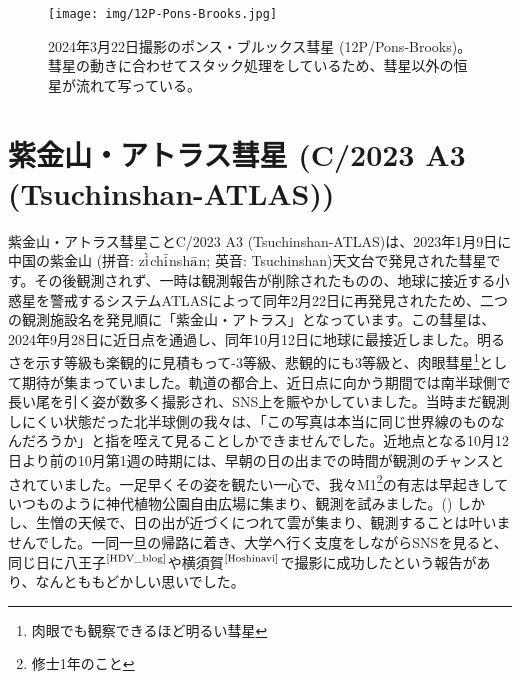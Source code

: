 \documentclass{supernova_pre}
\begin{document}
\begin{figure}[H]
  \centering
  \texttt{[image: img/12P-Pons-Brooks.jpg]}
  \caption{2024年3月22日撮影のポンス・ブルックス彗星 (12P/Pons-Brooks)。彗星の動きに合わせてスタック処理をしているため、彗星以外の恒星が流れて写っている。}
  \label{fig:Pons-Brooks}
\end{figure}

\section{紫金山・アトラス彗星 (C/2023 A3 (Tsuchinshan-ATLAS))}

紫金山・アトラス彗星ことC/2023 A3 (Tsuchinshan-ATLAS)は、2023年1月9日に中国の紫金山 (拼音: z$\Grave{\textrm{{i}}}$ch$\Bar{\textrm{{i}}}$nsh$\Bar{\textrm{{a}}}$n; 英音: Tsuchinshan)天文台で発見された彗星です。その後観測されず、一時は観測報告が削除されたものの、地球に接近する小惑星を警戒するシステムATLASによって同年2月22日に再発見されたため、二つの観測施設名を発見順に「紫金山・アトラス」となっています。この彗星は、2024年9月28日に近日点を通過し、同年10月12日に地球に最接近しました。明るさを示す等級も楽観的に見積もって-3等級、悲観的にも3等級と、肉眼彗星\footnote{肉眼でも観察できるほど明るい彗星}として期待が集まっていました。軌道の都合上、近日点に向かう期間では南半球側で長い尾を引く姿が数多く撮影され、SNS上を賑やかしていました。当時まだ観測しにくい状態だった北半球側の我々は、「この写真は本当に同じ世界線のものなんだろうか」と指を咥えて見ることしかできませんでした。近地点となる10月12日より前の10月第1週の時期には、早朝の日の出までの時間が観測のチャンスとされていました。一足早くその姿を観たい一心で、我々M1\footnote{修士1年のこと}の有志は早起きしていつものように神代植物公園自由広場に集まり、観測を試みました。() しかし、生憎の天候で、日の出が近づくにつれて雲が集まり、観測することは叶いませんでした。一同一旦の帰路に着き、大学へ行く支度をしながらSNSを見ると、同じ日に八王子$^\text{\cite{HDV_blog}}$や横須賀$^\text{\cite{Hoshinavi}}$で撮影に成功したという報告があり、なんとももどかしい思いでした。
\end{document}

